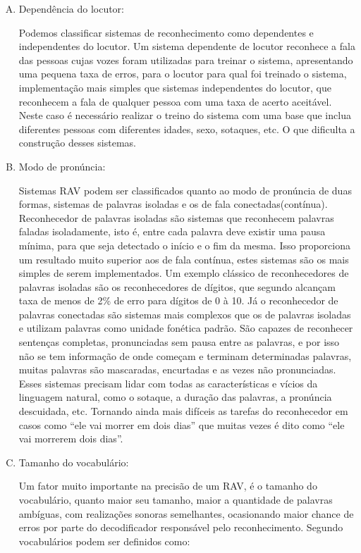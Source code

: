 \begin{enumerate}[(A)]
\item Dependência do locutor:

Podemos classificar sistemas de reconhecimento como dependentes e independentes do locutor. Um sistema dependente de locutor reconhece a fala das pessoas cujas vozes foram utilizadas para treinar o sistema, apresentando uma pequena taxa de erros, para o locutor para qual foi treinado o sistema,  implementação mais simples que sistemas independentes do locutor, que reconhecem a fala de qualquer pessoa com uma taxa de acerto aceitável. Neste caso é necessário realizar o treino do sistema com uma base que inclua diferentes pessoas com diferentes idades, sexo, sotaques, etc. O que dificulta a construção desses sistemas.
\item Modo de pronúncia:

Sistemas RAV podem ser classificados quanto ao modo de pronúncia de duas formas, sistemas de palavras isoladas e os de fala conectadas(contínua). Reconhecedor de palavras isoladas são sistemas que reconhecem palavras faladas isoladamente, isto é, entre cada palavra deve existir uma pausa mínima, para que seja detectado o início e o fim da mesma. Isso proporciona um resultado muito superior aos de fala contínua, estes sistemas são os mais simples de serem implementados. Um exemplo clássico de reconhecedores de palavras isoladas são os reconhecedores de dígitos, que segundo  alcançam taxa de menos de 2{\%} de erro para dígitos de 0 à 10.
Já o reconhecedor de palavras conectadas são sistemas mais complexos que os de palavras isoladas e utilizam palavras como unidade fonética padrão. São capazes de reconhecer sentenças completas, pronunciadas sem pausa entre as palavras, e por isso não se tem informação de onde começam e terminam determinadas palavras, muitas palavras são mascaradas, encurtadas e as vezes não pronunciadas. Esses sistemas precisam lidar com todas as características e vícios da linguagem natural, como o sotaque, a duração das palavras, a pronúncia descuidada, etc. Tornando ainda mais difíceis as tarefas do reconhecedor em casos como “ele vai morrer em dois dias” que 
muitas vezes  é dito como “ele vai morrerem dois dias”.
\item Tamanho do vocabulário:

Um fator muito importante na precisão de um RAV, é o tamanho do vocabulário, quanto maior seu tamanho, maior a quantidade de palavras ambíguas, com realizações sonoras semelhantes, ocasionando maior chance de erros por parte do decodificador responsável pelo reconhecimento. Segundo \cite{RavIsolAnderson} vocabulários podem ser definidos como:


\end{enumerate}
